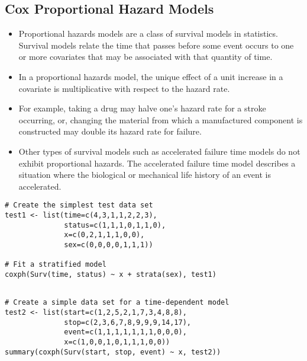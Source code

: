\subsection*{Cox Proportional Hazard Models}
\begin{itemize}
\item Proportional hazards models are a class of survival models in statistics. Survival models relate the time that passes before some event occurs to one or more covariates that may be associated with that quantity of time. \item In a proportional hazards model, the unique effect of a unit increase in a covariate is multiplicative with respect to the hazard rate. \item For example, taking a drug may halve one's hazard rate for a stroke occurring, or, changing the material from which a manufactured component is constructed may double its hazard rate for failure. \item Other types of survival models such as accelerated failure time models do not exhibit proportional hazards. The accelerated failure time model describes a situation where the biological or mechanical life history of an event is accelerated.
\end{itemize}

\begin{framed}
\begin{verbatim}
# Create the simplest test data set 
test1 <- list(time=c(4,3,1,1,2,2,3), 
              status=c(1,1,1,0,1,1,0), 
              x=c(0,2,1,1,1,0,0), 
              sex=c(0,0,0,0,1,1,1)) 

# Fit a stratified model 
coxph(Surv(time, status) ~ x + strata(sex), test1) 
\end{verbatim}
\end{framed}


\begin{framed}
\begin{verbatim}

# Create a simple data set for a time-dependent model 
test2 <- list(start=c(1,2,5,2,1,7,3,4,8,8), 
              stop=c(2,3,6,7,8,9,9,9,14,17), 
              event=c(1,1,1,1,1,1,1,0,0,0), 
              x=c(1,0,0,1,0,1,1,1,0,0)) 
summary(coxph(Surv(start, stop, event) ~ x, test2)) 



\end{verbatim}
\end{framed}


